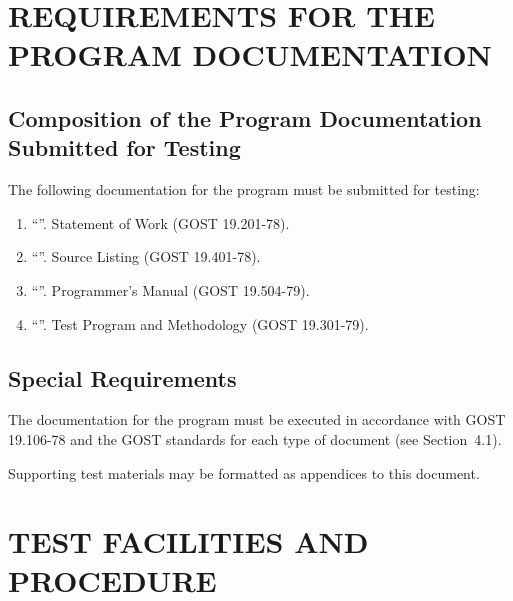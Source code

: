 \documentclass[12pt,a4paper]{extarticle}
\begin{document}
\clearpage

\section{REQUIREMENTS FOR THE PROGRAM DOCUMENTATION}

\subsection{Composition of the Program Documentation Submitted for Testing}


The following documentation for the program must be submitted for testing:
\begin{enumerate}[label=\arabic*), leftmargin=1.25cm]
    \item \enquote{\projectname}. Statement of Work (GOST 19.201-78).
    \item \enquote{\projectname}. Source Listing (GOST 19.401-78).
    \item \enquote{\projectname}. Programmer's Manual (GOST 19.504-79).
    \item \enquote{\projectname}. Test Program and Methodology
          (GOST 19.301-79).
\end{enumerate}

\subsection{Special Requirements}

The documentation for the program must be executed in accordance with GOST 19.106-78\cite{gost19106} and the GOST standards for each type of document (see Section~4.1).

Supporting test materials may be formatted as appendices to this document.

\clearpage

\section{TEST FACILITIES AND PROCEDURE}
\end{document}
